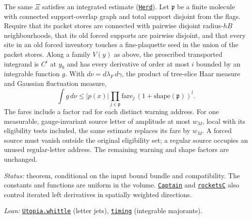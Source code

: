 \documentclass[
  letterpaper,
  11pt]{article}
\begin{document}
The same \(\Xi\) satisfies an integrated estimate
(\href{https://github.com/yang-mills-group/OpenAI-YM-20261028/blob/3456e5e75cf8d4cd558955a5c7638fba2d68f464/YM/PhysicalNext/RG_NEXT_COMPLETE_REPEATABLE_NONLINEAR_STEP/Daisy/Charm.lean\#L48-L55}{\texttt{Herd}}).
Let \(\mathfrak p\) be a finite molecule with connected support-overlap
graph and total support disjoint from the flags. Require that its packet
stores are connected with pairwise disjoint radius-\(hB\)
neighbourhoods, that its old forced supports are pairwise disjoint, and
that every site in an old forced inventory touches a fine-plaquette seed
in the union of the packet stores. Along a family \(V(y)\) as above, the
prescribed transported integrand is \(C^i\) at \(y_0\) and has every
derivative of order at most \(i\) bounded by an integrable function
\(g\). With \(d\nu=d\lambda_F\,d\gamma\), the product of tree-slice Haar
measure and Gaussian fluctuation measure,
\[\int g\,d\nu\le |p(x)|\prod_{j\in\mathfrak p}\mathrm{fare}_j\,(1+\mathrm{shape}(\mathfrak p))^l.\]
The fares include a factor \(\mathrm{rad}\) for each distinct warning
address. For one measurable, gauge-invariant source letter of amplitude
at most \(w_M\), local with its eligibility tests included, the same
estimate replaces its fare by \(w_M\). A forced source must vanish
outside the original eligibility set; a regular source occupies an
unused regular-letter address. The remaining warning and shape factors
are unchanged.

\emph{Status:} theorem, conditional on the input bound bundle and
compatibility. The constants and functions are uniform in the volume.
\href{https://github.com/yang-mills-group/OpenAI-YM-20261028/blob/3456e5e75cf8d4cd558955a5c7638fba2d68f464/YM/AnalyticNext/CONNECTED_ACTIVITY_JETS_E6/Captains.lean\#L27-L36}{\texttt{Captain}}
and
\href{https://github.com/yang-mills-group/OpenAI-YM-20261028/blob/3456e5e75cf8d4cd558955a5c7638fba2d68f464/YM/PhysicalNext/RG_NEXT_COMPLETE_REPEATABLE_NONLINEAR_STEP/Daisy/Sparks.lean\#L36-L61}{\texttt{rocketsC}}
also control iterated left derivatives in spatially weighted directions.

\emph{Lean:}
\href{https://github.com/yang-mills-group/OpenAI-YM-20261028/blob/3456e5e75cf8d4cd558955a5c7638fba2d68f464/YM/AnalyticNext/CONNECTED_ACTIVITY_JETS_E6/Das.lean\#L49-L102}{\texttt{Utopia.whittle}}
(letter jets),
\href{https://github.com/yang-mills-group/OpenAI-YM-20261028/blob/3456e5e75cf8d4cd558955a5c7638fba2d68f464/YM/PhysicalNext/RG_NEXT_COMPLETE_REPEATABLE_NONLINEAR_STEP/Daisy/Charm.lean\#L58-L179}{\texttt{timing}}
(integrable majorants).
\end{document}
